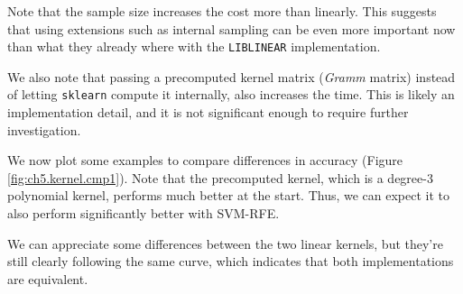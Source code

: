 Note that the sample size increases the cost more than linearly. This suggests that using extensions such as internal sampling can be even more important now than what they already where with the \texttt{LIBLINEAR} implementation.

We also note that passing a precomputed kernel matrix (\emph{Gramm} matrix) instead of letting \texttt{sklearn} compute it internally, also increases the time. This is likely an implementation detail, and it is not significant enough to require further in\-ves\-ti\-ga\-tion.

We now plot some examples to compare differences in accuracy (Figure \ref{fig:ch5.kernel.cmp1}). Note that the precomputed kernel, which is a degree-3 polynomial kernel, performs much better at the start. Thus, we can expect it to also perform significantly better with SVM-RFE. 

We can appreciate some differences between the two linear kernels, but they're still clearly following the same curve, which indicates that both implementations are equivalent.  

